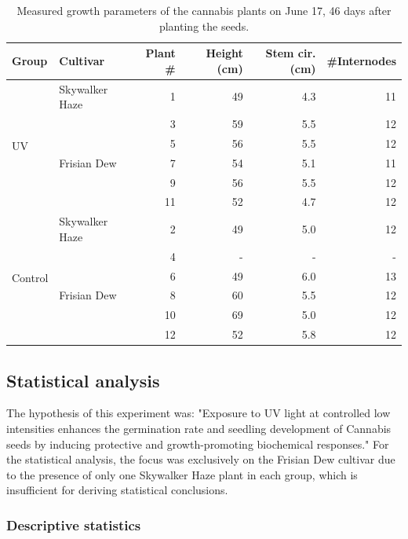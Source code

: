 \begin{table}[H]
    \caption[Measured growth parameters of the cannabis plants]{Measured growth parameters of the cannabis plants on June 17, \num[mode=text]{46} days after planting the seeds.}
    \label{tab:measured_growth_parameters}
    \begin{tabular}{llrrrr}
        \toprule
        Group & Cultivar & Plant \# & Height (\unit[mode=text]{\cm}) & Stem cir. (\unit[mode=text]{\cm}) & \#{}Internodes \\
        \midrule
        \multirow{6}{*}{UV} & Skywalker Haze & 1 & 49 & 4.3 & 11 \\
        & \multirow[t]{5}{*}{Frisian Dew} & 3 & 59 & 5.5 & 12 \\
        & & 5 & 56 & 5.5 & 12 \\
        & & 7 & 54 & 5.1 & 11 \\
        & & 9 & 56 & 5.5 & 12 \\
        & & 11 & 52 & 4.7 & 12 \\
        \midrule
        \multirow{6}{*}{Control} & Skywalker Haze & 2 & 49 & 5.0 & 12 \\
        & \multirow[t]{5}{*}{Frisian Dew} & 4 & - & - & - \\
        & & 6 & 49 & 6.0 & 13 \\
        & & 8 & 60 & 5.5 & 12 \\
        & & 10 & 69 & 5.0 & 12 \\
        & & 12 & 52 & 5.8 & 12 \\
        \bottomrule
    \end{tabular}
\end{table}

\subsection{Statistical analysis}

The hypothesis of this experiment was: "Exposure to UV light at controlled low intensities enhances the germination rate and seedling development of Cannabis seeds by inducing protective and growth-promoting biochemical responses." For the statistical analysis, the focus was exclusively on the Frisian Dew cultivar due to the presence of only one Skywalker Haze plant in each group, which is insufficient for deriving statistical conclusions.

\subsubsection{Descriptive statistics}

